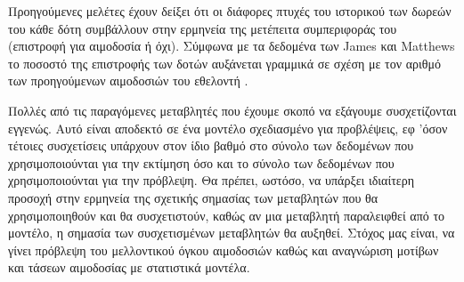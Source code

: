 	Προηγούμενες μελέτες έχουν δείξει ότι οι διάφορες πτυχές του ιστορικού των δωρεών του κάθε δότη συμβάλλουν στην ερμηνεία της μετέπειτα συμπεριφοράς του (επιστροφή για αιμοδοσία ή όχι). Σύμφωνα με τα δεδομένα των James και Matthews το ποσοστό της επιστροφής των δοτών αυξάνεται γραμμικά σε σχέση με τον αριθμό των  προηγούμενων αιμοδοσιών του εθελοντή \cite{number_d}. 
		
		Πολλές από τις παραγόμενες μεταβλητές που έχουμε σκοπό να εξάγουμε συσχετίζονται εγγενώς. Αυτό είναι αποδεκτό σε ένα μοντέλο σχεδιασμένο για προβλέψεις, εφ 'όσον τέτοιες συσχετίσεις υπάρχουν στον ίδιο βαθμό στο σύνολο των δεδομένων που χρησιμοποιούνται για την εκτίμηση όσο και το σύνολο των δεδομένων που χρησιμοποιούνται για την πρόβλεψη. Θα πρέπει, ωστόσο, να υπάρξει ιδιαίτερη προσοχή στην ερμηνεία της σχετικής σημασίας των μεταβλητών που θα χρησιμοποιηθούν και θα συσχετιστούν, καθώς αν μια μεταβλητή παραλειφθεί από το μοντέλο, η σημασία των συσχετισμένων μεταβλητών θα αυξηθεί. Στόχος μας είναι, να γίνει πρόβλεψη του μελλοντικού όγκου αιμοδοσιών καθώς και αναγνώριση μοτίβων και τάσεων αιμοδοσίας με στατιστικά μοντέλα.